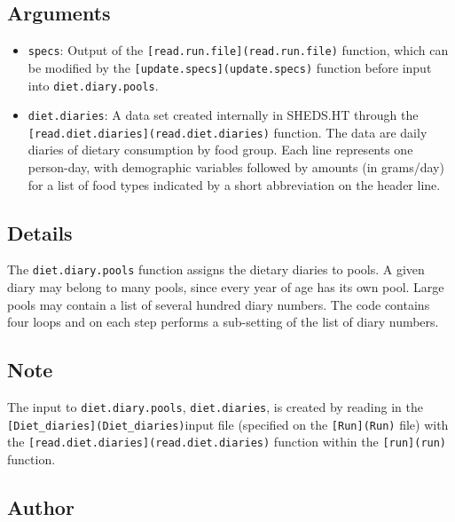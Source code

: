 \documentclass[
]{article}
\providecommand{\tightlist}{%
  \setlength{\itemsep}{0pt}\setlength{\parskip}{0pt}}
\begin{document}
\hypertarget{arguments-9}{%
\subsection{Arguments}\label{arguments-9}}

\begin{itemize}
\tightlist
\item
  \texttt{specs}: Output of the
  \texttt{{[}read.run.file{]}(read.run.file)} function, which can be
  modified by the \texttt{{[}update.specs{]}(update.specs)} function
  before input into \texttt{diet.diary.pools}.
\item
  \texttt{diet.diaries}: A data set created internally in SHEDS.HT
  through the \texttt{{[}read.diet.diaries{]}(read.diet.diaries)}
  function. The data are daily diaries of dietary consumption by food
  group. Each line represents one person-day, with demographic variables
  followed by amounts (in grams/day) for a list of food types indicated
  by a short abbreviation on the header line.
\end{itemize}

\hypertarget{details-7}{%
\subsection{Details}\label{details-7}}

The \texttt{diet.diary.pools} function assigns the dietary diaries to
pools. A given diary may belong to many pools, since every year of age
has its own pool. Large pools may contain a list of several hundred
diary numbers. The code contains four loops and on each step performs a
sub-setting of the list of diary numbers.

\hypertarget{note-1}{%
\subsection{Note}\label{note-1}}

The input to \texttt{diet.diary.pools}, \texttt{diet.diaries}, is
created by reading in the
\texttt{{[}Diet\_diaries{]}(Diet\_diaries)}input file (specified on the
\texttt{{[}Run{]}(Run)} file) with the
\texttt{{[}read.diet.diaries{]}(read.diet.diaries)} function within the
\texttt{{[}run{]}(run)} function.

\hypertarget{author-8}{%
\subsection{Author}\label{author-8}}
\end{document}

